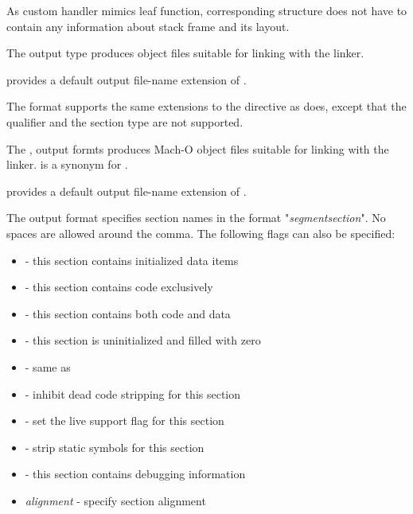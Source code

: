 As custom handler mimics leaf function, corresponding 
structure does not have to contain any information about stack frame
and its layout.


The  output type produces  object files suitable for
linking with the  linker.

 provides a default output file-name extension of .

The  format supports the same extensions to the 
directive as  does, except that the  qualifier and
the  section type are not supported.


The ,  output formts produces Mach-O
object files suitable for linking with the  linker.
 is a synonym for .

 provides a default output file-name extension of .


The  output format specifies section names in the format
"\emph{segment}\code{,}\emph{section}". No spaces are allowed around the
comma. The following flags can also be specified:

\begin{itemize}
    \item{ - this section contains initialized data items}
    \item{ - this section contains code exclusively}
    \item{ - this section contains both code and data}
    \item{ - this section is uninitialized and filled with zero}
    \item{ - same as }
    \item{ - inhibit dead code stripping for this section}
    \item{ - set the live support flag for this section}
    \item{ - strip static symbols for this section}
    \item{ - this section contains debugging information}
    \item{\emph{alignment} - specify section alignment}
\end{itemize}

